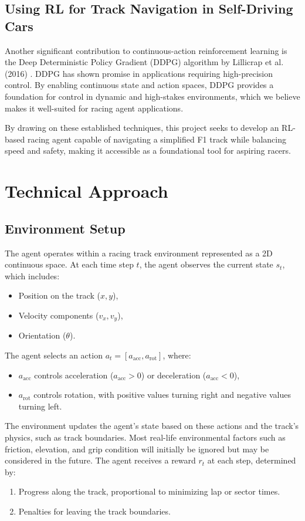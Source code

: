 \documentclass{article}
\begin{document}
\subsection{Using RL for Track Navigation in Self-Driving Cars}
Another significant contribution to continuous-action reinforcement learning is the Deep Deterministic Policy Gradient (DDPG) algorithm by Lillicrap et al. (2016) \cite{lillicrap2015continuous}. DDPG has shown promise in applications requiring high-precision control. By enabling continuous state and action spaces, DDPG provides a foundation for control in dynamic and high-stakes environments, which we believe makes it well-suited for racing agent applications.

By drawing on these established techniques, this project seeks to develop an RL-based racing agent capable of navigating a simplified F1 track while balancing speed and safety, making it accessible as a foundational tool for aspiring racers.


\section{Technical Approach}
\subsection{Environment Setup}

The agent operates within a racing track environment represented as a 2D continuous space. At each time step \(t\), the agent observes the current state \(s_t\), which includes:
\begin{itemize}
    \item Position on the track (\(x, y\)),
    \item Velocity components (\(v_x, v_y\)),
    \item Orientation (\(\theta\)).
\end{itemize}

The agent selects an action \(a_t = [a_{\text{acc}}, a_{\text{rot}}]\), where:
\begin{itemize}
    \item \(a_{\text{acc}}\) controls acceleration (\(a_{\text{acc}} > 0\)) or deceleration (\(a_{\text{acc}} < 0\)),
    \item \(a_{\text{rot}}\) controls rotation, with positive values turning right and negative values turning left.
\end{itemize}

The environment updates the agent’s state based on these actions and the track's physics, such as track boundaries. Most real-life environmental factors such as friction, elevation, and grip condition will initially be ignored but may be considered in the future. The agent receives a reward \(r_t\) at each step, determined by:
\begin{enumerate}
    \item Progress along the track, proportional to minimizing lap or sector times.
    \item Penalties for leaving the track boundaries.
\end{enumerate}
\end{document}
